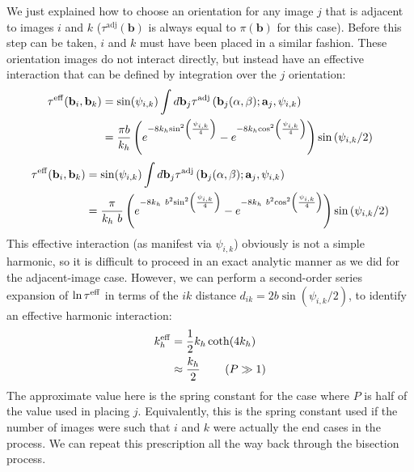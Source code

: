                     We just explained how to choose an orientation for any image $j$ that is adjacent to images $i$ and $k$ ($\tau^\text{adj} ({\mathbf b})$ is always equal to $\pi ({\mathbf b})$ for this case). Before this step can be taken, $i$ and $k$ must have been placed in a similar fashion. These orientation images do not interact directly, but instead have an effective interaction that can be defined by integration over the $j$ orientation:
\ifkhExplicitP
\begin{equation}
\begin{aligned}
\label{eq:piEff}
    \tau^{\rm eff}({\mathbf b}_i,{\mathbf b}_k)&= \sin(\psi_{i,k})\int d{\mathbf b}_j \tau^\text{adj} \left( {\mathbf b}_j(\alpha, \beta); \mathbf{a}_j, \psi_{i,k} \right) \nonumber \\
&=\frac{\pi b}{k_h}\left( {{e^{ - 8{k_h}{{\sin }^2}\left( {\frac{\psi_{i,k} }{4}} \right)}} - {e^{ - 8{k_h}{{\cos }^2}\left( {\frac{\psi_{i,k} }{4}} \right)}}} \right){{\sin \left( {\psi_{i,k} /2} \right)}}
\end{aligned}
\end{equation}
\else
\begin{equation}
\begin{aligned}
\label{eq:piEff}
\tau^{\rm eff}({\mathbf b}_i,{\mathbf b}_k)&= \sin(\psi_{i,k})\int d{\mathbf b}_j \tau^\text{adj} \left( {\mathbf b}_j(\alpha, \beta); \mathbf{a}_j, \psi_{i,k} \right) \nonumber \\
&=\frac{\pi}{k_h~b}\left( {{e^{ - 8{k_h~b^2}{{\sin }^2}\left( {\frac{\psi_{i,k} }{4}} \right)}} - {e^{ - 8{k_h~b^2}{{\cos }^2}\left( {\frac{\psi_{i,k} }{4}} \right)}}} \right){{\sin \left( {\psi_{i,k} /2} \right)}}
\end{aligned}
\end{equation}
\fi
This effective interaction (as manifest via $\psi_{i,k}$) obviously is not a simple harmonic, so  it is difficult to proceed in an exact analytic manner as we did for the adjacent-image case. However, we can perform a second-order series expansion of $\ln \tau^{\rm eff}$ in terms of the $ik$ distance $d_{ik} = 2b\sin(\psi_{i,k}/2)$, to identify an effective harmonic interaction:
\begin{align}
k_h^{\rm eff} &= \frac{1}{2}k_h\coth(4 k_h)\\
&\approx \frac{k_h}{2}    {\hspace{0.3in}} (P \gg 1)\nonumber
\end{align}
The approximate value here is the spring constant for the case where $P$ is half of the value used in placing $j$. Equivalently, this is the spring constant used if the number of images were such that $i$ and $k$ were actually the end cases in the process. We can repeat this prescription all the way back through the bisection process. 

